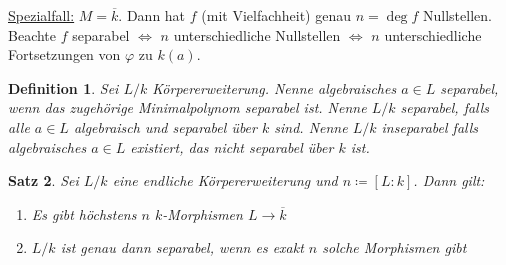 \documentclass[a4paper,12pt,numbers=noenddot,parskip=full]{scrartcl}
\newcommand{\heading}{\underline}
\theoremstyle{dotless}
\newtheorem{theorem}{Satz}[section]
\newtheorem{definition}[theorem]{Definition}
\theoremstyle{remark}
\begin{document}
	\heading{Spezialfall:} $M = \overline{k}$. Dann hat $f$ (mit Vielfachheit) genau $n = \deg f$ Nullstellen. Beachte $f$ separabel $\Leftrightarrow$ $n$ unterschiedliche Nullstellen $\Leftrightarrow$ $n$ unterschiedliche Fortsetzungen von $\varphi$ zu $k(a)$.
	
	\begin{definition}
		Sei $L/k$ Körpererweiterung. Nenne algebraisches $a \in L$ separabel, wenn das zugehörige Minimalpolynom separabel ist. Nenne $L/k$ separabel, falls alle $a \in L$ algebraisch und separabel über $k$ sind. Nenne $L/k$ inseparabel falls algebraisches $a \in L$ existiert, das nicht separabel über $k$ ist.
	\end{definition}

	\begin{theorem}
		Sei $L/k$ eine endliche Körpererweiterung und $n \coloneqq  [L:k]$. Dann gilt:
		\begin{enumerate}
			\item Es gibt höchstens $n$ $k$-Morphismen $L \to \overline{k}$
			\item $L/k$ ist genau dann separabel, wenn es exakt $n$ solche Morphismen gibt
		\end{enumerate}
	\end{theorem}
\end{document}
